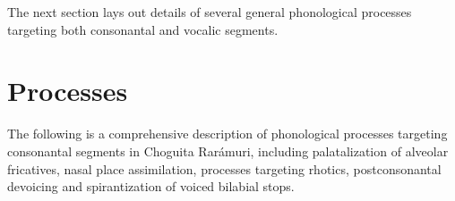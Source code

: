     \z
\z

The next section lays out details of several general phonological processes targeting both consonantal and vocalic segments.

\section{Processes}
\label{sec: general phonological processes}

The following is a comprehensive description of phonological processes targeting consonantal segments in Choguita Rarámuri, including palatalization of alveolar fricatives, nasal place assimilation, processes targeting rhotics, postconsonantal devoicing and spirantization of voiced bilabial stops.

